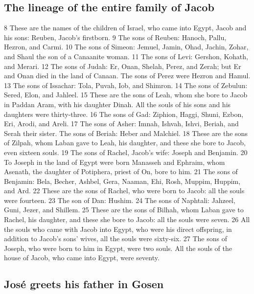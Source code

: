\hypertarget{the-lineage-of-the-entire-family-of-jacob}{%
\subsection{The lineage of the entire family of
Jacob}\label{the-lineage-of-the-entire-family-of-jacob}}

{8} These are the names of the children of Israel, who came into Egypt,
Jacob and his sons: Reuben, Jacob's firstborn. {9} The sons of Reuben:
Hanoch, Pallu, Hezron, and Carmi. {10} The sons of Simeon: Jemuel,
Jamin, Ohad, Jachin, Zohar, and Shaul the son of a Canaanite woman. {11}
The sons of Levi: Gershon, Kohath, and Merari. {12} The sons of Judah:
Er, Onan, Shelah, Perez, and Zerah; but Er and Onan died in the land of
Canaan. The sons of Perez were Hezron and Hamul. {13} The sons of
Issachar: Tola, Puvah, Iob, and Shimron. {14} The sons of Zebulun:
Sered, Elon, and Jahleel. {15} These are the sons of Leah, whom she bore
to Jacob in Paddan Aram, with his daughter Dinah. All the souls of his
sons and his daughters were thirty-three. {16} The sons of Gad: Ziphion,
Haggi, Shuni, Ezbon, Eri, Arodi, and Areli. {17} The sons of Asher:
Imnah, Ishvah, Ishvi, Beriah, and Serah their sister. The sons of
Beriah: Heber and Malchiel. {18} These are the sons of Zilpah, whom
Laban gave to Leah, his daughter, and these she bore to Jacob, even
sixteen souls. {19} The sons of Rachel, Jacob's wife: Joseph and
Benjamin. {20} To Joseph in the land of Egypt were born Manasseh and
Ephraim, whom Asenath, the daughter of Potiphera, priest of On, bore to
him. {21} The sons of Benjamin: Bela, Becher, Ashbel, Gera, Naaman, Ehi,
Rosh, Muppim, Huppim, and Ard. {22} These are the sons of Rachel, who
were born to Jacob: all the souls were fourteen. {23} The son of Dan:
Hushim. {24} The sons of Naphtali: Jahzeel, Guni, Jezer, and Shillem.
{25} These are the sons of Bilhah, whom Laban gave to Rachel, his
daughter, and these she bore to Jacob: all the souls were seven. {26}
All the souls who came with Jacob into Egypt, who were his direct
offspring, in addition to Jacob's sons' wives, all the souls were
sixty-six. {27} The sons of Joseph, who were born to him in Egypt, were
two souls. All the souls of the house of Jacob, who came into Egypt,
were seventy.

\hypertarget{josuxe9-greets-his-father-in-gosen}{%
\subsection{José greets his father in
Gosen}\label{josuxe9-greets-his-father-in-gosen}}


